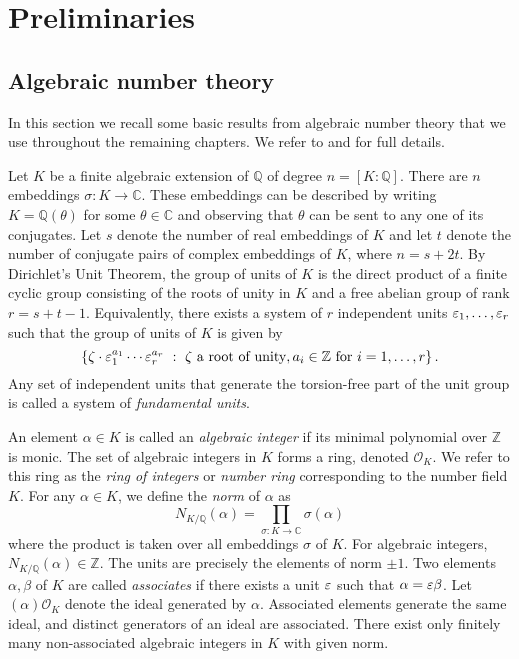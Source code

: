 
\chapter{Preliminaries}
\label{ch:Preliminaries}


\section{Algebraic number theory} 
\label{sec:AlgebraicNumberTheory}

In this section we recall some basic results from algebraic number theory that we use throughout the remaining chapters. We refer to \cite{Mar} and \cite{Neuk} for full details. 

Let $K$ be a finite algebraic extension of $\mathbb{Q}$ of degree $n = [K:\mathbb{Q}]$. There are $n$ embeddings $\sigma: K \to \mathbb{C}$. These embeddings can be described by writing $K = \mathbb{Q}(\theta)$ for some $\theta \in \mathbb{C}$ and observing that $\theta$ can be sent to any one of its conjugates. 
Let $s$ denote the number of real embeddings of $K$ and let $t$ denote the number of conjugate pairs of complex embeddings of $K$, where $n = s + 2t$. By Dirichlet's Unit Theorem, the group of units of $K$ is the direct product of a finite cyclic group consisting of the roots of unity in $K$ and a free abelian group of rank $r = s + t -1$. Equivalently, there exists a system of $r$ independent units $\varepsilon_1, \dots, \varepsilon_r$ such that the group of units of $K$ is given by 
\[\left\{\zeta \cdot \varepsilon_1^{a_1}\cdots \varepsilon_r^{a_r} \ : \ \zeta \text{ a root of unity}, a_i \in \mathbb{Z} \text{ for } i = 1, \dots, r\right\}.\]
Any set of independent units that generate the torsion-free part of the unit group is called a system of \textit{fundamental units}. 

An element $\alpha \in K$ is called an \textit{algebraic integer} if its minimal polynomial over $\mathbb{Z}$ is monic. The set of algebraic integers in $K$ forms a ring, denoted $\mathcal{O}_K$. We refer to this ring as the \textit{ring of integers} or \textit{number ring} corresponding to the number field $K$. For any $\alpha \in K$, we define the \textit{norm} of $\alpha$ as 
\[N_{K/\mathbb{Q}}(\alpha) = \prod_{\sigma:K \to \mathbb{C}} \sigma(\alpha)\]
where the product is taken over all embeddings $\sigma$ of $K$. For algebraic integers, $N_{K/\mathbb{Q}}(\alpha) \in \mathbb{Z}$. The units are precisely the elements of norm $\pm 1$. Two elements $\alpha, \beta$ of $K$ are called \textit{associates} if there exists a unit $\varepsilon$ such that $\alpha = \varepsilon \beta$. Let $(\alpha)\mathcal{O}_K$ denote the ideal generated by $\alpha$. Associated elements generate the same ideal, and distinct generators of an ideal are associated. There exist only finitely many non-associated algebraic integers in $K$ with given norm. 

